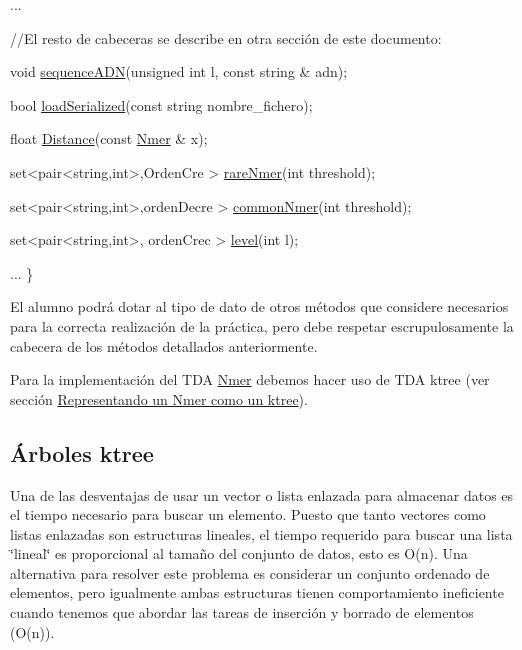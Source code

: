 \begin{DoxyCode}
  ...
 
  \textcolor{comment}{//El resto de cabeceras se describe en otra sección de este documento: }

  \textcolor{keywordtype}{void} \hyperlink{classNmer_ae8871242f0e282d71e4c9b4685f468be}{sequenceADN}(\textcolor{keywordtype}{unsigned} \textcolor{keywordtype}{int} l, \textcolor{keyword}{const} \textcolor{keywordtype}{string} & adn);  

  \textcolor{keywordtype}{bool} \hyperlink{classNmer_a418c016bb6e04d2f699ddb694ee0221f}{loadSerialized}(\textcolor{keyword}{const} \textcolor{keywordtype}{string} nombre\_fichero);
 
  \textcolor{keywordtype}{float}  \hyperlink{classNmer_a8df2f2f355423b02413e5e29dc5639e8}{Distance}(\textcolor{keyword}{const} \hyperlink{classNmer}{Nmer} & x);

  set<pair<string,int>,OrdenCre > \hyperlink{classNmer_ac878556843a4b401b4be0e1be6747e45}{rareNmer}(\textcolor{keywordtype}{int} threshold); 

  set<pair<string,int>,ordenDecre > \hyperlink{classNmer_aaf801908e364dd05d7cc33c81d944b0a}{commonNmer}(\textcolor{keywordtype}{int} threshold);

  set<pair<string,int>, ordenCrec > \hyperlink{classNmer_a38059ff69b4934e18a5c467338179761}{level}(\textcolor{keywordtype}{int} l);

  ...
\}
\end{DoxyCode}


El alumno podrá dotar al tipo de dato de otros métodos que considere necesarios para la correcta realización de la práctica, pero debe respetar escrupulosamente la cabecera de los métodos detallados anteriormente.

Para la implementación del T\+DA \hyperlink{classNmer}{Nmer} debemos hacer uso de T\+DA ktree (ver sección \hyperlink{index_ktreegen}{Representando un Nmer como un ktree}).\hypertarget{index_secKtree}{}\subsection{Árboles ktree}\label{index_secKtree}
Una de las desventajas de usar un vector o lista enlazada para almacenar datos es el tiempo necesario para buscar un elemento. Puesto que tanto vectores como listas enlazadas son estructuras lineales, el tiempo requerido para buscar una lista \char`\"{}lineal\char`\"{} es proporcional al tamaño del conjunto de datos, esto es O(n). Una alternativa para resolver este problema es considerar un conjunto ordenado de elementos, pero igualmente ambas estructuras tienen comportamiento ineficiente cuando tenemos que abordar las tareas de inserción y borrado de elementos (O(n)).

